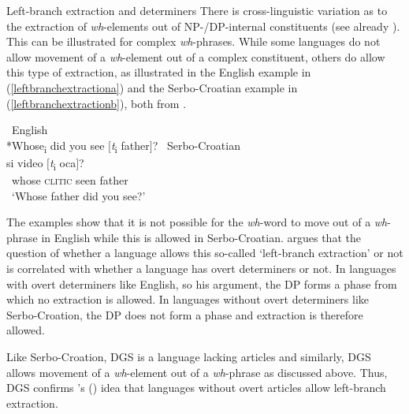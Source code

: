 \begin{digression}{Left-branch extraction and determiners}{}
\noindent There is cross-linguistic variation as to the extraction of \textit{wh}-elements out of NP-/DP-internal constituents (see already \citealt{ross1967constraints}). This can be illustrated for complex \textit{wh}-phrases. While some languages do not allow movement of a \textit{wh}-element out of a complex constituent, others do allow this type of extraction, as illustrated in the English example in (\ref{leftbranchextractiona}) and the Serbo-Croatian example in (\ref{leftbranchextractionb}), both from \citet[14--15]{bovskovic2005left}. 



\begin{exe}
\ex\label{leftbranchextraction}\begin{xlist} 
\ex \textcolor{white}{*}English \\ *Whose\textsubscript{i} did you see $[$\textit{t}\textsubscript{i} father$]$? \label{leftbranchextractiona}
\ex \textcolor{white}{*}Serbo-Croatian \\  {si} {video} {$[$\textit{t}\textsubscript{i}} {oca$]$?}  \\
{\textcolor{white}{*}whose} {\textsc{clitic}} {seen} {} {father} \\
\trans \textcolor{white}{*}`Whose father did you see?' \label{leftbranchextractionb} 
\end{xlist}
\end{exe} 

\noindent The examples show that it is not possible for the \textit{wh}-word to move out of a \textit{wh}-phrase in English while this is allowed in Serbo-Croatian. \citet{bovskovic2005left, bovskovic2005locality} argues that the question of whether a language allows this so-called `left-branch extraction' or not is correlated with whether a language has overt determiners or not. In languages with overt determiners like English, so his argument, the DP forms a phase from which no extraction is allowed. In languages without overt determiners like Serbo-Croation, the DP does not form a phase and extraction is therefore allowed.

Like Serbo-Croation, DGS is a language lacking articles \citep[91]{happ2014vork} and similarly, DGS allows movement of a \textit{wh}-element out of a \textit{wh}-phrase as discussed above. Thus, DGS confirms \citeauthor{bovskovic2005left}'s (\citeyear{bovskovic2005left, bovskovic2005locality}) idea that languages without overt articles allow left-branch extraction.


\end{digression}
